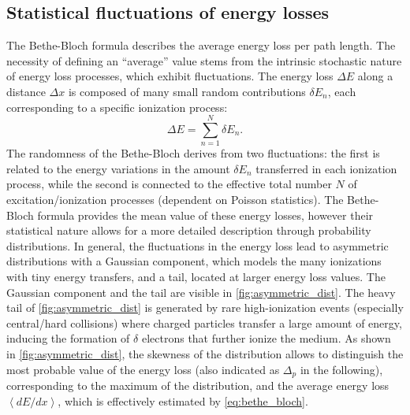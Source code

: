 \subsection{Statistical fluctuations of energy losses}\label{ssec:stat_fluct}
The Bethe-Bloch formula describes the average energy loss per path length. The necessity of defining an ``average'' value stems from the intrinsic stochastic nature of energy loss processes, which exhibit fluctuations. The energy loss $\Delta E$ along a distance $\Delta x$ is composed of many small random contributions $\delta E_n$, each corresponding to a specific ionization process:
\begin{equation}
	\Delta E = \sum_{n=1}^{N}\delta E_n.
	\label{eq:stochastic_bethe}
\end{equation}
The randomness of the Bethe-Bloch derives from two fluctuations: the first is related to the energy variations in the amount $\delta E_n$ transferred in each ionization process, while the second is connected to the effective total number $N$ of excitation/ionization processes (dependent on Poisson statistics). The Bethe-Bloch formula provides the mean value of these energy losses, however their statistical nature allows for a more detailed description through probability distributions. In general, the fluctuations in the energy loss lead to asymmetric distributions with a Gaussian component, which models the many ionizations with tiny energy transfers, and a tail, located at larger energy loss values. The Gaussian component and the tail are visible in \autoref{fig:asymmetric_dist}. The heavy tail of \autoref{fig:asymmetric_dist} is generated by rare high-ionization events (especially central/hard collisions) where charged particles transfer a large amount of energy, inducing the formation of $\delta$ electrons that further ionize the medium. As shown in \autoref{fig:asymmetric_dist}, the skewness of the distribution allows to distinguish the most probable value of the energy loss (also indicated as $\Delta_p$ in the following), corresponding to the maximum of the distribution, and the average energy loss $\left\langle dE/dx \right\rangle$, which is effectively estimated by \autoref{eq:bethe_bloch}. 

